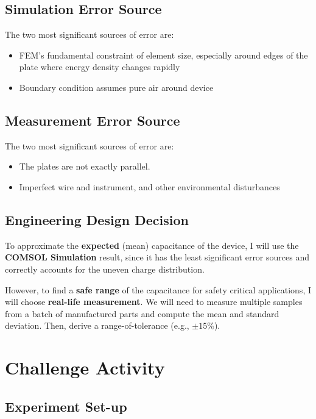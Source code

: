 \documentclass[
	letterpaper, %
	11pt, %
]{CSUniSchoolLabReport}
\begin{document}
\subsection{Simulation Error Source}

The two most significant sources of error are:

\begin{itemize}
    \item FEM's fundamental constraint of element size, especially around edges of the plate where energy density changes rapidly
    \item Boundary condition assumes pure air around device
\end{itemize}

\subsection{Measurement Error Source}

The two most significant sources of error are:

\begin{itemize}
    \item The plates are not exactly parallel.
    \item Imperfect wire and instrument, and other environmental disturbances
\end{itemize}

\subsection{Engineering Design Decision}


To approximate the \textbf{expected} (mean) capacitance of the device, I will use the \textbf{COMSOL Simulation} result, since it has the least significant error sources and correctly accounts for the uneven charge distribution.

However, to find a \textbf{safe range} of the capacitance for safety critical applications, I will choose \textbf{real-life measurement}. We will need to measure multiple samples from a batch of manufactured parts and compute the mean and standard deviation. Then, derive a range-of-tolerance (e.g., $\pm 15\%$).

\pagebreak

\section{Challenge Activity}

\subsection{Experiment Set-up}
\end{document}
